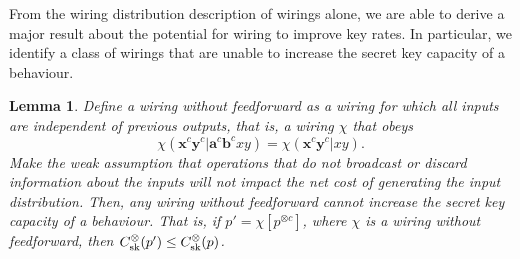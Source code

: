 \documentclass[10pt, a4paper]{article}
\numberwithin{equation}{section} %
\newcounter{stmt} %
\theoremstyle{definition}
\theoremstyle{plain}
\newtheorem{lemma}[stmt]{Lemma}
\newcommand{\?}{\mathrel{?}} %
\newcommand{\cvec}[1]{\boldsymbol{\mathbf{#1}}}    %
\newcommand{\sk}{\rm sk}
\begin{document}
                  From the wiring distribution description of wirings alone, we are able to derive a major result about the potential for wiring to improve key rates. In particular, we identify a class of wirings that are unable to increase the secret key capacity of a behaviour.
              \begin{lemma}\label{thm:feedforward}
                Define a \emph{wiring without feedforward} as a wiring for which all inputs are independent of previous outputs, that is, a wiring \(\chi\) that obeys
                \begin{equation}\label{eqn:nooutputdep}
                  \chi(\cvec{x}^c\cvec{y}^c|\cvec{a}^c\cvec{b}^cxy) = \chi(\cvec{x}^c\cvec{y}^c|xy).
                \end{equation}
                Make the weak assumption that operations that do not broadcast or discard information about the inputs will not impact the net cost of generating the input distribution. Then, any wiring without feedforward cannot increase the secret key capacity of a behaviour. That is, if \(p' = \chi[p^{\otimes c}]\), where \(\chi\) is a wiring without feedforward, then \(C_{\sk}^{\otimes}(p') \leq C_{\sk}^{\otimes}(p)\).
              \end{lemma}
\end{document}
